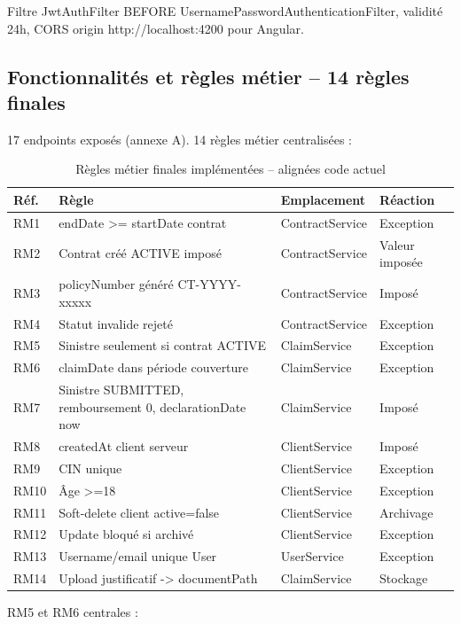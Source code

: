 \documentclass[a4paper,12pt]{article}
\begin{document}
Filtre JwtAuthFilter BEFORE UsernamePasswordAuthenticationFilter, validité 24h, CORS origin http://localhost:4200 pour Angular.

\subsection{Fonctionnalités et règles métier -- 14 règles finales}
17 endpoints exposés (annexe A). 14 règles métier centralisées :

\begin{table}[htbp]
\centering
\caption{Règles métier finales implémentées -- alignées code actuel}
\label{tab:rm}
\small
\begin{tabularx}{\linewidth}{@{}C{1.1cm} X L{2.5cm} L{2.4cm}@{}}
\toprule
\textbf{Réf.} & \textbf{Règle} & \textbf{Emplacement} & \textbf{Réaction} \\
\midrule
RM1  & endDate >= startDate contrat & ContractService & Exception \\
RM2  & Contrat créé ACTIVE imposé & ContractService & Valeur imposée \\
RM3  & policyNumber généré CT-YYYY-xxxxx & ContractService & Imposé \\
RM4  & Statut invalide rejeté & ContractService & Exception \\
RM5  & Sinistre seulement si contrat ACTIVE & ClaimService & Exception \\
RM6  & claimDate dans période couverture & ClaimService & Exception \\
RM7  & Sinistre SUBMITTED, remboursement 0, declarationDate now & ClaimService & Imposé \\
RM8  & createdAt client serveur & ClientService & Imposé \\
RM9  & CIN unique & ClientService & Exception \\
RM10 & Âge >=18 & ClientService & Exception \\
RM11 & Soft-delete client active=false & ClientService & Archivage \\
RM12 & Update bloqué si archivé & ClientService & Exception \\
RM13 & Username/email unique User & UserService & Exception \\
RM14 & Upload justificatif -> documentPath & ClaimService & Stockage \\
\bottomrule
\end{tabularx}
\end{table}

RM5 et RM6 centrales :
\end{document}

